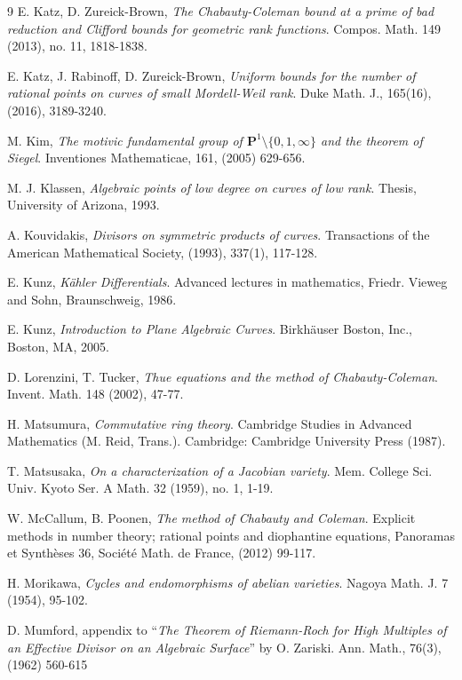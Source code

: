 \documentclass[11pt]{amsart}
\theoremstyle{remark}
\numberwithin{equation}{section}
\begin{document}
\begin{thebibliography}{9}
 E. Katz, D. Zureick-Brown, \emph{The Chabauty-Coleman bound at a prime of bad reduction and Clifford bounds for geometric rank functions}. Compos. Math. 149 (2013), no. 11, 1818-1838.

 E. Katz, J. Rabinoff, D. Zureick-Brown, \emph{Uniform bounds for the number of rational points on curves of small Mordell-Weil rank}. Duke Math. J.,  165(16), (2016), 3189-3240.

 M. Kim, \emph{The motivic fundamental group of $\mathbf{P}^1\setminus \{0,1,\infty\}$ and the theorem of Siegel}. Inventiones Mathematicae, 161, (2005) 629-656.

 M. J. Klassen, \emph{Algebraic points of low degree on curves of low rank}. Thesis, University of Arizona, 1993.



 A. Kouvidakis, \emph{Divisors on symmetric products of curves}. Transactions of the American Mathematical Society,  (1993), 337(1), 117-128.

 E. Kunz, \emph{K\"ahler Differentials}. Advanced lectures in mathematics, Friedr. Vieweg and Sohn, Braunschweig, 1986.

 E. Kunz, \emph{Introduction to Plane Algebraic Curves}. Birkh\"auser Boston, Inc., Boston, MA, 2005.


 D. Lorenzini, T. Tucker, \emph{Thue equations and the method of Chabauty-Coleman}. Invent. Math. 148 (2002), 47-77.


 H. Matsumura, \emph{Commutative ring theory}. Cambridge Studies in Advanced Mathematics (M. Reid, Trans.). Cambridge: Cambridge University Press (1987).

  T. Matsusaka, \emph{On a characterization of a Jacobian variety}. Mem. College Sci. Univ. Kyoto Ser. A Math. 32 (1959), no. 1, 1-19.

 W. McCallum, B. Poonen,  \emph{The method of Chabauty and Coleman}. Explicit methods in number theory; rational points and diophantine equations, Panoramas et Synth\`eses 36, Soci\'et\'e Math. de France, (2012) 99-117.

 H. Morikawa, \emph{Cycles and endomorphisms of abelian varieties}. Nagoya Math. J. 7 (1954), 95-102.


 D. Mumford, appendix to ``\emph{The Theorem of Riemann-Roch for High Multiples of an Effective Divisor on an Algebraic Surface}'' by O. Zariski. Ann. Math., 76(3), (1962) 560-615 



\end{thebibliography}
\end{document}
